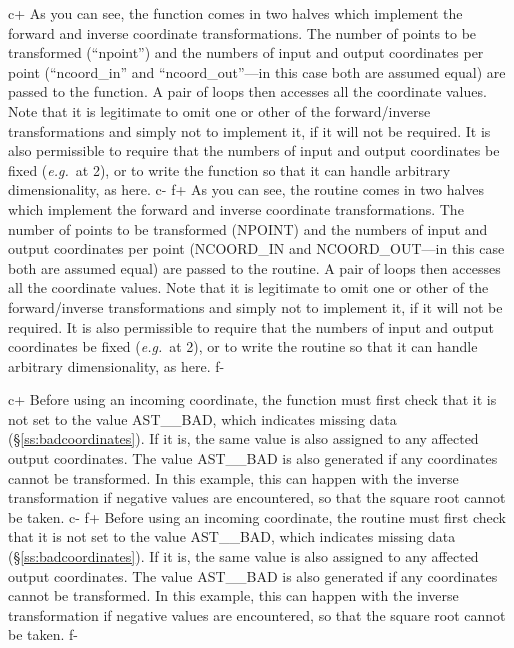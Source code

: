 \documentclass[twoside,11pt]{starlink}
\providecommand{\secref}[1]{\S\ref{#1}}
\begin{document}
c+
As you can see, the function comes in two halves which implement the
forward and inverse coordinate transformations. The number of points
to be transformed (``npoint'') and the numbers of input and output
coordinates per point (``ncoord\_in'' and ``ncoord\_out''---in this
case both are assumed equal) are passed to the function. A pair of
loops then accesses all the coordinate values.  Note that it is
legitimate to omit one or other of the forward/inverse transformations
and simply not to implement it, if it will not be required. It is also
permissible to require that the numbers of input and output
coordinates be fixed (\emph{e.g.}\ at 2), or to write the function so
that it can handle arbitrary dimensionality, as here.
c-
f+
As you can see, the routine comes in two halves which implement the
forward and inverse coordinate transformations. The number of points
to be transformed (NPOINT) and the numbers of input and output
coordinates per point (NCOORD\_IN and NCOORD\_OUT---in this case both
are assumed equal) are passed to the routine. A pair of loops then
accesses all the coordinate values.  Note that it is legitimate to
omit one or other of the forward/inverse transformations and simply
not to implement it, if it will not be required. It is also
permissible to require that the numbers of input and output
coordinates be fixed (\emph{e.g.}\ at 2), or to write the routine so
that it can handle arbitrary dimensionality, as here.
f-

c+
Before using an incoming coordinate, the function must first check
that it is not set to the value AST\_\_BAD, which indicates missing
data (\secref{ss:badcoordinates}). If it is, the same value is also
assigned to any affected output coordinates. The value AST\_\_BAD is
also generated if any coordinates cannot be transformed. In this
example, this can happen with the inverse transformation if negative
values are encountered, so that the square root cannot be taken.
c-
f+
Before using an incoming coordinate, the routine must first check that
it is not set to the value AST\_\_BAD, which indicates missing data
(\secref{ss:badcoordinates}). If it is, the same value is also
assigned to any affected output coordinates. The value AST\_\_BAD is
also generated if any coordinates cannot be transformed. In this
example, this can happen with the inverse transformation if negative
values are encountered, so that the square root cannot be taken.
f-
\end{document}
